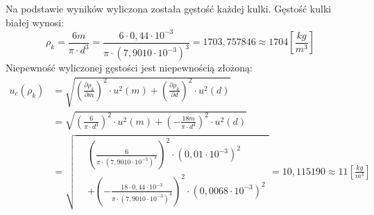 \documentclass[polish, 11pt, a4paper]{article}
\begin{document}
		Na podstawie wyników wyliczona została gęstość każdej kulki. Gęstość kulki białej wynosi:
		\begin{displaymath}
		\rho_k	=\frac{6 m}{\pi \cdot d^3}=\frac{6\cdot 0,44\cdot 10^{-3}}{\pi \cdot (7,9010\cdot 10^{-3})^3}
			=1703,757846\approx 1704\left[\frac{kg}{m^3}\right]
		\end{displaymath}
		Niepewność wyliczonej gęstości jest niepewnością złożoną:
		\begin{align*}
		u_c(\rho_k)	&=\sqrt{\left(\frac{\partial \rho_k}{\partial m}\right)^2\cdot u^2(m)+\left(\frac{\partial \rho_k}{\partial d}\right)^2\cdot u^2(d)}\\
					&=\sqrt{\left(\frac{6}{\pi\cdot d^3}\right)^2\cdot u^2(m) + \left(-\frac{18m}{\pi\cdot d^4}\right)^2\cdot u^2(d)}\\
					&=\sqrt{
						\begin{aligned}
						&\left(\frac{6}{\pi\cdot (7,9010\cdot 10^{-3})^3}\right)^2\cdot (0,01\cdot 10^{-3})^2\\ &+\left(-\frac{18\cdot0,44\cdot 10^{-3}}{\pi\cdot (7,9010\cdot 10^{-3})^4}\right)^2\cdot (0,0068\cdot 10^{-3})^2
						\end{aligned}
					} = 10,115190\approx 11\left[\frac{kg}{m^3}\right]
		\end{align*}
\end{document}
